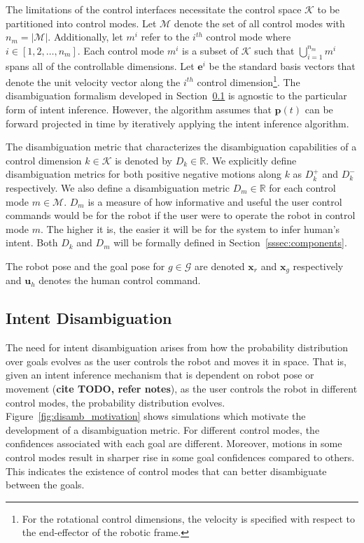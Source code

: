 The limitations of the control interfaces necessitate the control space $\mathcal{K}$ to be partitioned into control modes. Let $\mathcal{M}$ denote the set of all control modes with $n_m = \vert\mathcal{M}\vert$. Additionally, let $m^i$ refer to the $i^{th}$ control mode where $i \in [1,2,\dots,n_m]$. Each control mode $m^i$ is a subset of $\mathcal{K}$ such that $\bigcup\limits_{i=1}^{n_m} m^i$ spans all of the controllable dimensions. Let $\boldsymbol{e}^i$ be the standard basis vectors that denote the unit velocity vector along the $i^{th}$ control dimension\footnote{For the rotational control dimensions, the velocity is specified with respect to the end-effector of the robotic frame.}. The disambiguation formalism developed in Section~\ref{ssec:disamb} is agnostic to the particular form of intent inference. However, the algorithm assumes that $\boldsymbol{p}(t)$ can be forward projected in time by iteratively applying the intent inference algorithm. 

The disambiguation metric that characterizes the disambiguation capabilities of a control dimension $k \in \mathcal{K}$ is denoted by $D_k \in \mathbb{R}$. We explicitly define disambiguation metrics for both positive negative motions along $k$ as $D_k^{+}$ and $D_k^{-}$ respectively. We also define a disambiguation metric $D_m \in \mathbb{R}$ for each control mode $m \in \mathcal{M}$. $D_m$ is a measure of how informative and useful the user control commands would be for the robot if the user were to operate the robot in control mode $m$. The higher it is, the easier it will be for the system to infer human's intent. Both $D_k$ and $D_m$ will be formally defined in Section~\ref{sssec:components}.

The robot pose and the goal pose for $g \in \mathcal{G}$ are denoted $\boldsymbol{x}_r$ and $\boldsymbol{x}_g$ respectively and $\boldsymbol{u}_h$ denotes the human control command.
\subsection{Intent Disambiguation}\label{ssec:disamb} 
The need for intent disambiguation arises from how the probability distribution over goals evolves as the user controls the robot and moves it in space. That is, given an intent inference mechanism that is dependent on robot pose or movement (\textbf{cite TODO, refer notes}), as the user controls the robot in different control modes, the probability distribution evolves. Figure~\ref{fig:disamb_motivation} shows simulations which motivate the development of a disambiguation metric. For different control modes, the confidences associated with each goal are different. Moreover, motions in some control modes result in sharper rise in some goal confidences compared to others. This indicates the existence of control modes that can better disambiguate between the goals. 

